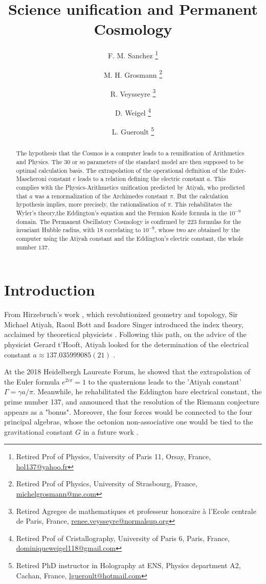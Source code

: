 \documentclass[a4paper,9pt]{article}
\title{Science unification and Permanent Cosmology}
\author{F. M. Sanchez \thanks{Retired Prof of Physics, University of Paris 11, Orsay, France, \href{mailto:hol137@yahoo.fr}{hol137@yahoo.fr}} 
   \and M. H. Grosmann \thanks{Retired Prof of Physics, University of Strasbourg, France, \href{mailto:michelgrosmann@me.com}{michelgrosmann@me.com}}
   \and R. Veysseyre \thanks{Retired Agregee de mathematiques et professeur honoraire \`a l'Ecole centrale de Paris, France, \href{mailto:renee.veysseyre@normalsup.org}{renee.veysseyre@normalsup.org}}
   \and D. Weigel  \thanks{Retired Prof of Cristallography, University of Paris 6, Paris, France, \href{mailto:dominiqueweigel118@gmail.com}{dominiqueweigel118@gmail.com}} 
   \and L. Gueroult \thanks{Retired PhD instructor in Holography at ENS, Physics department A2, Cachan, France, \href{mailto:lgueroult@hotmail.com}{lgueroult@hotmail.com}}
   }
\begin{document}
\setcounter{page}{1}

\maketitle

\begin{abstract}
The hypothesis that the Cosmos is a computer leads to a reunification of Arithmetics and Physics. The 30 or so parameters of the standard model are then supposed to be optimal calculation basis. The extrapolation of the operational definition of the Euler-Mascheroni constant $e$ leads to a relation defining the electric constant $a$. This complies with the Physics-Arithmetics unification predicted by Atiyah, who predicted that $a$ was a renormalization of the Archimedes constant $\pi$. But the calculation hypothesis implies, more precisely, the rationalisation of $\pi$. This rehabilitates the Wyler's theory,the Eddington's equation and the Fermion Koide formula in the $10^{-9}$ domain. The Permanent Oscillatory Cosmology is confirmed by 223 formulas for the invariant Hubble radius, with 18 correlating to $10^{-9}$, whose two are obtained by the computer using the Atiyah constant and the Eddington's electric constant, the whole number $137 $. 
\end{abstract}





\label{sec:headings}

\section{Introduction}
  
    From Hirzebruch's work \cite{Hirzebruch}, which revolutionized geometry and topology, Sir Michael Atiyah, Raoul Bott \cite{Bott} and Isadore Singer \cite{Singer} introduced the index theory, acclaimed by theoretical physicists \cite{Alvarez}. Following this path, on the advice of the physicist Gerard t'Hooft, Atiyah looked for the determination of the electrical constant $a \approx 137.035999085(21)$ \cite{Atiyah}.
    
    
    At the 2018 Heidelbergh Laureate Forum, he showed that the extrapolation of the Euler formula  $e^{2i\pi} = 1$ to the quaternions leads to the 'Atiyah constant' $\Gamma = \gamma a/\pi $. Meanwhile, he rehabilitated the Eddington \cite{Eddington} bare electrical constant, the prime number 137, and announced that the resolution of the Riemann conjecture appears as a "bonus". Moreover, the four forces would be connected to the four principal algebras, whose the octonion non-associative one would be tied to the gravitational constant $G$ in a future work \cite{Atiyah}. 
    
\end{document}
